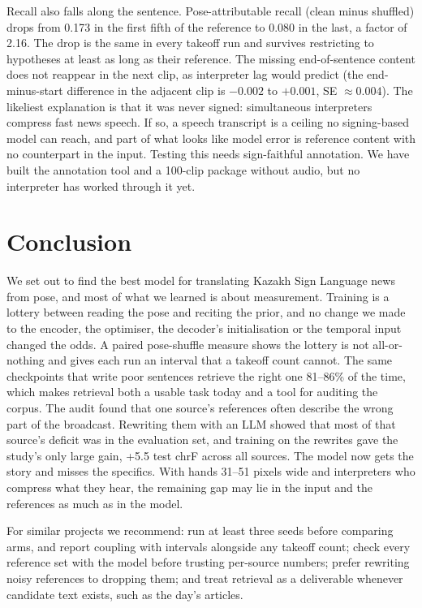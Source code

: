 \documentclass[11pt,twocolumn,a4paper]{article}
\begin{document}
Recall also falls along the sentence. Pose-attributable recall (clean minus shuffled) drops from 0.173 in the first fifth of the reference to 0.080 in the last, a factor of 2.16. The drop is the same in every takeoff run and survives restricting to hypotheses at least as long as their reference. The missing end-of-sentence content does not reappear in the next clip, as interpreter lag would predict (the end-minus-start difference in the adjacent clip is $-0.002$ to $+0.001$, SE $\approx 0.004$). The likeliest explanation is that it was never signed: simultaneous interpreters compress fast news speech. If so, a speech transcript is a ceiling no signing-based model can reach, and part of what looks like model error is reference content with no counterpart in the input. Testing this needs sign-faithful annotation. We have built the annotation tool and a 100-clip package without audio, but no interpreter has worked through it yet.

\section{Conclusion}

We set out to find the best model for translating Kazakh Sign Language news from pose, and most of what we learned is about measurement. Training is a lottery between reading the pose and reciting the prior, and no change we made to the encoder, the optimiser, the decoder's initialisation or the temporal input changed the odds. A paired pose-shuffle measure shows the lottery is not all-or-nothing and gives each run an interval that a takeoff count cannot. The same checkpoints that write poor sentences retrieve the right one 81--86\% of the time, which makes retrieval both a usable task today and a tool for auditing the corpus. The audit found that one source's references often describe the wrong part of the broadcast. Rewriting them with an LLM showed that most of that source's deficit was in the evaluation set, and training on the rewrites gave the study's only large gain, +5.5 test chrF across all sources. The model now gets the story and misses the specifics. With hands 31--51 pixels wide and interpreters who compress what they hear, the remaining gap may lie in the input and the references as much as in the model.

For similar projects we recommend: run at least three seeds before comparing arms, and report coupling with intervals alongside any takeoff count; check every reference set with the model before trusting per-source numbers; prefer rewriting noisy references to dropping them; and treat retrieval as a deliverable whenever candidate text exists, such as the day's articles.
\end{document}
